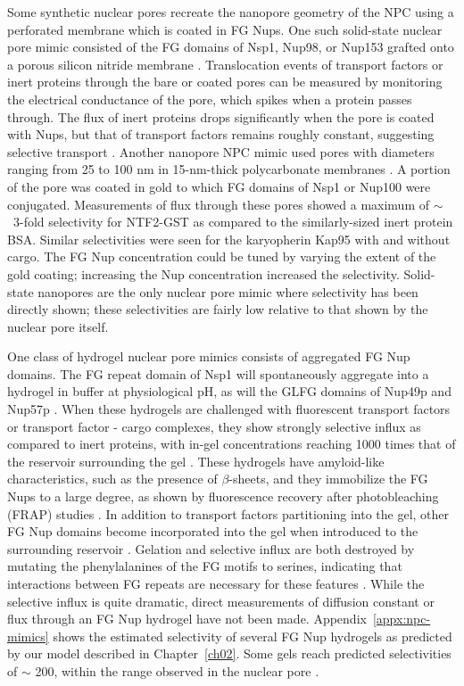 Some synthetic nuclear pores recreate the nanopore geometry of the NPC using a perforated membrane which is coated in FG Nups.  One such solid-state nuclear pore mimic consisted of the FG domains of Nsp1, Nup98, or Nup153 grafted onto a porous silicon nitride membrane \cite{kowalczyk11,ananth18a}.  Translocation events of transport factors or inert proteins through the bare or coated pores can be measured by monitoring the electrical conductance of the pore, which spikes when a protein passes through.  The flux of inert proteins drops significantly when the pore is coated with Nups, but that of transport factors remains roughly constant, suggesting selective transport \cite{ananth18a}.  Another nanopore NPC mimic used pores with diameters ranging from 25 to 100 nm in 15-nm-thick polycarbonate membranes \cite{jovanovic-talisman09}.  A portion of the pore was coated in gold to which FG domains of Nsp1 or Nup100 were conjugated.  Measurements of flux through these pores showed a maximum of $\sim$~3-fold selectivity for NTF2-GST as compared to the similarly-sized inert protein BSA.  Similar selectivities were seen for the karyopherin Kap95 with and without cargo.  The FG Nup concentration could be tuned by varying the extent of the gold coating; increasing the Nup concentration increased the selectivity.  Solid-state nanopores are the only nuclear pore mimic where selectivity has been directly shown; these selectivities are fairly low relative to that shown by the nuclear pore itself.


One class of hydrogel nuclear pore mimics consists of aggregated FG Nup domains.  The FG repeat domain of Nsp1 will spontaneously aggregate into a hydrogel in buffer at physiological pH, as will the GLFG domains of Nup49p and Nup57p \cite{frey06,frey09}.  When these hydrogels are challenged with fluorescent transport factors or transport factor - cargo complexes, they show strongly selective influx as compared to inert proteins, with in-gel concentrations reaching 1000 times that of the reservoir surrounding the gel \cite{frey07}.  These hydrogels have amyloid-like characteristics, such as the presence of $\beta$-sheets, and they immobilize the FG Nups to a large degree, as shown by fluorescence recovery after photobleaching (FRAP) studies \cite{ader10,frey06}.  In addition to transport factors partitioning into the gel, other FG Nup domains become incorporated into the gel when introduced to the surrounding reservoir \cite{frey06}.  Gelation and selective influx are both destroyed by mutating the phenylalanines of the FG motifs to serines, indicating that interactions between FG repeats are necessary for these features \cite{frey07}.   While the selective influx is quite dramatic, direct measurements of diffusion constant or flux through an FG Nup hydrogel have not been made.  Appendix~\ref{appx:npc-mimics} shows the estimated selectivity of several FG Nup hydrogels as predicted by our model described in Chapter~\ref{ch02}.  Some gels reach predicted selectivities of $\sim$ 200, within the range observed in the nuclear pore \cite{ribbeck01, siebrasse02, kiskin03}.

